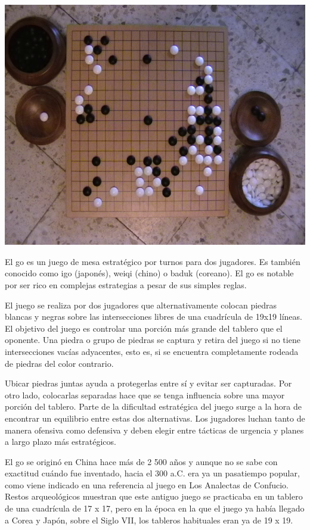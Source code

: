 \documentclass[12pt,a4papert,woside,openright,titlepage,final]{book}
\begin{document}
\includegraphics[scale=0.50]{baduk.png}

El go es un juego de mesa estratégico por turnos para dos jugadores. Es 
también conocido como igo (japonés), weiqi (chino) o baduk (coreano). El go 
es notable por ser rico en complejas estrategias a pesar de sus simples reglas.

El juego se realiza por dos jugadores que alternativamente colocan piedras
blancas y negras sobre las intersecciones libres de una cuadrícula de 19x19
líneas. El objetivo del juego es controlar una porción más grande del tablero
que el oponente. Una piedra o grupo de piedras se captura y retira del juego si
no tiene intersecciones vacías adyacentes, esto es, si se encuentra
completamente rodeada de piedras del color contrario.

Ubicar piedras juntas ayuda a protegerlas entre sí y evitar ser capturadas. Por
otro lado, colocarlas separadas hace que se tenga influencia sobre una mayor
porción del tablero. Parte de la dificultad estratégica del juego surge a la
hora de encontrar un equilibrio entre estas dos alternativas. Los jugadores
luchan tanto de manera ofensiva como defensiva y deben elegir entre tácticas de
urgencia y planes a largo plazo más estratégicos.

El go se originó en China hace más de 2 500 años y aunque no se sabe con
exactitud cuándo fue inventado, hacia el 300 a.C. era ya un pasatiempo popular,
como viene indicado en una referencia al juego en Los Analectas de Confucio.
Restos arqueológicos muestran que este antiguo juego se practicaba en un tablero de
una cuadrícula de 17 x 17, pero en la época en la que el juego ya había llegado
a Corea y Japón, sobre el Siglo VII, los tableros habituales eran ya de 19 x 19.
\end{document}
